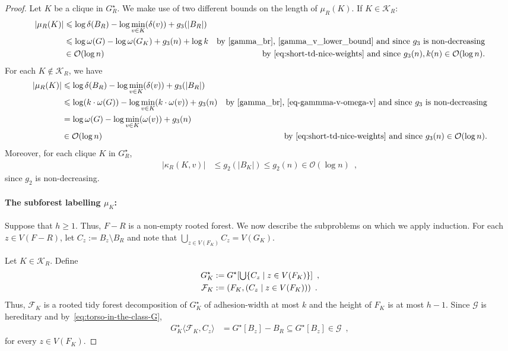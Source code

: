 \documentclass{patmorin}
\let\eqref\cref
\renewcommand{\le}{\leqslant}
\renewcommand{\geq}{\geqslant}
\renewcommand{\leq}{\leqslant}
\newcommand{\torso}[2]{{#1}\langle{#2}\rangle}
\newcommand{\Oh}{\mathcal{O}}
\DeclarePairedDelimiter{\set}{\{}{\}}
\begin{document}
\begin{proof}
    Let $K$ be a clique in $G^\star_R$. We make use of two different bounds on the length of $\mu_R(K)$.  If $K\in\mathcal{K}_R$:
    \begin{align}
       |\mu_R(K)|
       & \le\log \delta(B_R) - \log \min_{v\in K}(\delta(v)) + g_3(|B_R|) \notag \\
       & \le\log \omega(G) - \log \omega(G_K) + g_3(n) + \log k
       & \textrm{by~\eqref{gamma_br},~\eqref{gamma_v_lower_bound} and since $g_3$ is non-decreasing} \label{mu_RK_i}\\
       &\in\Oh(\log n)&\textrm{by~\eqref{eq:short-td-nice-weights} and since $g_3(n), k(n)\in\Oh(\log n).$}
    \end{align}
    For each $K\not\in\mathcal{K}_R$, we have
    \begin{align}
       |\mu_R(K)|
       & \le\log \delta(B_R) - \log\min_{v\in K}(\delta(v)) + g_3(|B_R|) \notag \\
       & \le\log(k\cdot\omega(G)) - \log\min_{v\in K}(k\cdot\omega(v)) + g_3(n)
       & \text{by \eqref{gamma_br},~\eqref{eq-gammma-v-omega-v} and since $g_3$ is non-decreasing}\notag\\
       & = \log \omega(G) - \log\min_{v\in K}(\omega(v)) + g_3(n)
       \label{mu_RK_ii}\\
       &\in\Oh(\log n)&\textrm{by~\eqref{eq:short-td-nice-weights} and since $g_3(n)\in\Oh(\log n)$.}
       \label{eq:mu_R(K)-in-logn}
    \end{align}
    Moreover, for each clique $K$ in $G^\star_R$,
    \begin{align}
      |\kappa_R(K,v)|
      & \leq g_2(|B_K|) \leq g_2(n) \in \Oh(\log n) \enspace ,
      \label{eq:kappa_R-logn}
    \end{align}
    since $g_2$ is non-decreasing.%

    \paragraph{\boldmath The subforest labelling $\mu_K$:}
    Suppose that $h\geq1$. Thus, $F-R$ is a non-empty rooted forest. We now describe the subproblems on which we apply induction. For each $z\in V(F-R)$, let $C_z:=B_z\setminus B_R$ and
    note that $\bigcup_{z\in V(F_K)}C_z=V(G_K)$.

    Let $K\in\mathcal{K}_R$. Define
    \begin{align*}
        G^\star_K&:=G^\star[\textstyle\bigcup\set{C_z\mid z\in V(F_K)}]\enspace,\\
        \mathcal{F}_K&:=(F_K, (C_z \mid z\in V(F_K)))\enspace.
    \end{align*}
    Thus, $\mathcal{F}_K$ is a rooted tidy forest decomposition of $G^\star_K$ of adhesion-width at most $k$ and the height of $F_K$ is at most $h-1$.
    Since $\mathcal{G}$ is hereditary and by~\eqref{eq:torso-in-the-class-G},
    \begin{align*}
        \torso{G^\star_K}{\mathcal{F}_K,C_z}&=G^\star[B_z]-B_R\subseteq G^\star[B_z]\in \mathcal{G}\enspace ,
    \end{align*}
    for every $z \in V(F_K)$.


\end{proof}
\end{document}
